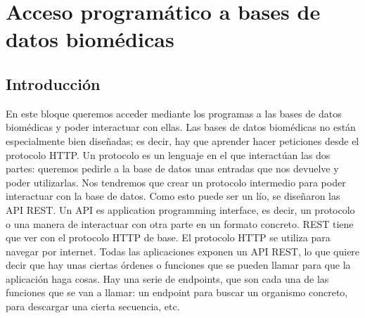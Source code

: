 \chapter{Acceso programático a bases de datos biomédicas}
\section{Introducción}
En este bloque queremos acceder mediante los programas a las bases de datos biomédicas y poder interactuar con ellas. Las bases de datos biomédicas no están especialmente bien diseñadas; es decir, hay que aprender hacer peticiones desde el protocolo HTTP. Un protocolo es un lenguaje en el que interactúan las dos partes: queremos pedirle a la base de datos unas entradas que nos devuelve y poder utilizarlas. Nos tendremos que crear un protocolo intermedio para poder interactuar con la base de datos. Como esto puede ser un lío, se diseñaron las API REST. Un API es application programming interface, es decir, un protocolo o una manera de interactuar con otra parte en un formato concreto. REST tiene que ver con el protocolo HTTP de base. El protocolo HTTP se utiliza para navegar por internet. Todas las aplicaciones exponen un API REST, lo que quiere decir que hay unas ciertas órdenes o funciones que se pueden llamar para que la aplicación haga cosas. Hay una serie de endpoints, que son cada una de las funciones que se van a llamar: un endpoint para buscar un organismo concreto, para descargar una cierta secuencia, etc. 

